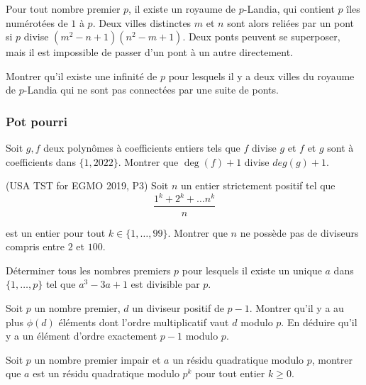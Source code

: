 \begin{exo}
Pour tout nombre premier $p$, il existe un royaume de $p$-Landia, qui contient $p$ îles numérotées de $1$ à $p$. Deux villes distinctes $m$ et $n$ sont alors reliées par un pont si $p$ divise $(m^2 - n + 1)(n^2 - m + 1)$. Deux ponts peuvent se superposer, mais il est impossible de passer d'un pont à un autre directement.

Montrer qu'il existe une infinité de $p$ pour lesquels il y a deux villes du royaume de $p$-Landia qui ne sont pas connectées par une suite de ponts.
\end{exo}

\subsubsection{Pot pourri}

\begin{exo}
Soit $g,f$ deux polynômes à coefficients entiers tels que $f$ divise $g$ et $f$ et $g$ sont à coefficients dans $\{1,2022\}$. Montrer que $\deg(f) + 1$ divise $deg(g) + 1$.
\end{exo}

\begin{exo}(USA TST for EGMO 2019, P3)
Soit $n$ un entier strictement positif tel que
$$\frac{1^k + 2^k + \dots n^k}{n}$$

est un entier pour tout $k\in\{1, \dots, 99\}$. Montrer que $n$ ne possède pas de diviseurs compris entre $2$ et $100$.
\end{exo}


\begin{exo}
Déterminer tous les nombres premiers $p$ pour lesquels il existe un unique $a$ dans $\{1,\dots, p\}$ tel que $a^3 - 3a + 1$ est divisible par $p$.
\end{exo}

\begin{exo}
Soit $p$ un nombre premier, $d$ un diviseur positif de $p - 1$. Montrer qu'il y a au plus $\phi(d)$ éléments dont l'ordre multiplicatif vaut $d$ modulo $p$. En déduire qu'il y a un élément d'ordre exactement $p - 1$ modulo $p$.
\end{exo}


\begin{exo}
Soit $p$ un nombre premier impair et $a$ un résidu quadratique modulo $p$, montrer que $a$ est un résidu quadratique modulo $p^k$ pour tout entier $k\geq 0$.
\end{exo}



